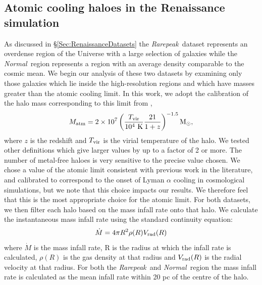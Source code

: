\documentclass[graphics, twocolumn, usenatbib]{mn2e}
\newcommand{\rarepeak} {\textit{Rarepeak~}}
\newcommand{\normal} {\textit{Normal~}}
\begin{document}
\subsection{Atomic cooling haloes in the Renaissance simulation}

As discussed in \S \ref{Sec:RenaissanceDatasets} the \rarepeak dataset represents an overdense
region of the Universe with a large selection of galaxies while the \normal region represents a
region with an average density comparable to the cosmic mean. We begin our analysis of these two
datasets by examining only those galaxies which lie inside the high-resolution regions and which
have masses greater than the atomic cooling limit. In this work, we
adopt the calibration of  
 the halo mass corresponding to this 
limit from \cite{Fernandez_2014},
%
\begin{equation}
  M_{\rm atm} = 2 \times 10^{7} \left( \frac{{T_{\rm vir}}}{10^4~{\rm K}}  \frac{21}{1+z} \right)^{-1.5} \rm{M_{\odot}},
\end{equation}
%
where $z$ is the redshift and $T_{\rm vir}$ is the virial temperature of the halo. 
We tested other definitions \citep[e.g.][]{Bromm_2011} which give larger
values by up to a factor of 2 or more. The number of metal-free haloes
is very sensitive to the precise value chosen. We chose a value of the atomic limit consistent
with previous work in the literature, and
calibrated to correspond to the onset of Lyman $\alpha$ cooling in cosmological simulations,
but we note that this choice impacts our results.
We therefore feel that this is the most appropriate choice for the atomic limit. 
For both datasets, we then filter each halo based on the mass infall rate onto that halo.
We calculate the instantaneous mass infall rate using the standard continuity equation:
\begin{equation}  
  \dot{M} = 4 \pi R^2 \rho(R) V_{\rm rad}(R)
\end{equation}
where  $\dot{M}$ is the mass infall rate, R is the radius at which the infall rate is calculated,
$\rho(R)$ is the gas density at that radius and $V_{\rm rad}(R)$ is the radial velocity at that radius.
For both the \rarepeak and \normal region the mass infall rate is calculated as the mean
infall rate within 20 pc of the centre of the halo. 
\end{document}
